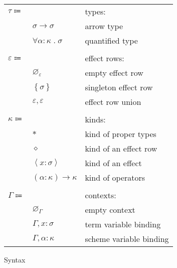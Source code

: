 \documentclass[12pt]{article}
\newcommand\anno[2]{#1 : #2} %
\newcommand\parens[1]{\left( #1 \right)} %
\newcommand\evar{x}
\newcommand\sscheme{\sigma}
\newcommand\svar{\alpha}
\newcommand\ttype{\tau}
\newcommand\tarrow[2]{#1 \rightarrow #2} %
\newcommand\ttforall[2]{\forall #1 \; . \; #2} %
\newcommand\rrow{\varepsilon}
\newcommand\rempty{\varnothing_{\rrow}}
\newcommand\rsingleton[1]{\left\{ #1 \right\}}
\newcommand\runion[2]{#1, #2}
\newcommand\kkind{\kappa}
\newcommand\ktype{\ast}
\newcommand\krow{\diamond} %
\newcommand\keffect[2]{\left\langle\anno{#1}{#2}\right\rangle}
\newcommand\karrow[2]{\parens{#1} \rightarrow #2} %
\newcommand\ccontext{\Gamma}
\newcommand\cempty{\varnothing_{\ccontext}}
\newcommand\cextend[2]{#1, #2}
\begin{document}
\begin{figure}
\begin{mdframed}[backgroundcolor=none]
\begin{center}
\begin{tabular}{l l l}
          \\
          $\ttype \Coloneqq$ & & types: \\
          & $\tarrow{\sscheme}{\sscheme}$ & arrow type \\
          & $\ttforall{\anno{\svar}{\kkind}}{\sscheme}$ & quantified type \\
          \\
          $\rrow \Coloneqq$ & & effect rows: \\
          & $\rempty$ & empty effect row \\
          & $\rsingleton{\sscheme}$ & singleton effect row \\
          & $\runion{\rrow}{\rrow}$ & effect row union \\
          \\
          $\kkind \Coloneqq $ & & kinds: \\
          & $\ktype$ & kind of proper types \\
          & $\krow$ & kind of an effect row \\
          & $\keffect{\evar}{\sscheme}$ & kind of an effect \\
          & $\karrow{\anno{\svar}{\kkind}}{\kkind}$ & kind of operators \\
          \\
          $\ccontext \Coloneqq$ & & contexts: \\
          & $\cempty$ & empty context \\
          & $\cextend{\ccontext}{\anno{\evar}{\sscheme}}$ & term variable binding \\
          & $\cextend{\ccontext}{\anno{\svar}{\kkind}}$ & scheme variable binding \\
        \end{tabular}
      \end{center}

      \caption{Syntax}\label{fig:syntax}
    \end{mdframed}
  \end{figure}
\end{document}
